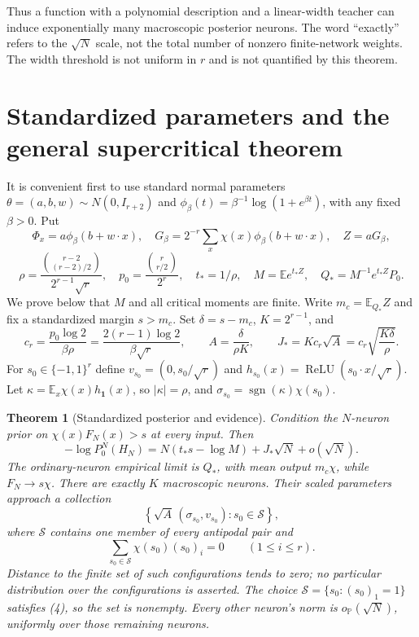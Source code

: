\documentclass[11pt]{article}
\newtheorem{theorem}{Theorem}\newtheorem{lemma}[theorem]{Lemma}
\newcommand{\E}{\mathbb E}\newcommand{\R}{\mathbb R}\newcommand{\Pp}{\mathbb P}
\newcommand{\one}{\mathbf1}\newcommand{\relu}{\operatorname{ReLU}}
\begin{document}
Thus a function with a polynomial description and a linear-width teacher
can induce exponentially many macroscopic posterior neurons. The word
``exactly'' refers to the $\sqrt N$ scale, not the total number of
nonzero finite-network weights. The width threshold is not uniform in
$r$ and is not quantified by this theorem.

\section{Standardized parameters and the general supercritical theorem}
It is convenient first to use standard normal parameters
$\theta=(a,b,w)\sim N(0,I_{r+2})$ and
$\phi_\beta(t)=\beta^{-1}\log(1+e^{\beta t})$, with any fixed $\beta>0$.
Put
\[
 \Phi_x=a\phi_\beta(b+w\cdot x),\quad
 G_\beta=2^{-r}\sum_x\chi(x)\phi_\beta(b+w\cdot x),\quad Z=aG_\beta,
\]
\[
 \rho=\frac{\binom{r-2}{(r-2)/2}}{2^{r-1}\sqrt r},\quad
 p_0=\frac{\binom r{r/2}}{2^r},\quad t_*=1/\rho,
 \quad M=\E e^{t_*Z},\quad Q_*=M^{-1}e^{t_*Z}P_0.
\]
We prove below that $M$ and all critical moments are finite.
Write $m_c=\E_{Q_*}Z$ and fix a standardized margin $s>m_c$.
Set $\delta=s-m_c$, $K=2^{r-1}$, and
\[
 c_r=\frac{p_0\log2}{\beta\rho}
       =\frac{2(r-1)\log2}{\beta\sqrt r},\qquad
 A=\frac{\delta}{\rho K},\qquad
 J_*=Kc_r\sqrt A=c_r\sqrt{\frac{K\delta}{\rho}}.             \tag{1}
\]
For $s_0\in\{-1,1\}^r$ define
$v_{s_0}=(0,s_0/\sqrt r)$ and
$h_{s_0}(x)=\relu(s_0\cdot x/\sqrt r)$.
Let $\kappa=\E_x\chi(x)h_{\one}(x)$, so $|\kappa|=\rho$, and
$\sigma_{s_0}=\operatorname{sgn}(\kappa)\chi(s_0)$.

\begin{theorem}[Standardized posterior and evidence]\label{thm:standard}
Condition the $N$-neuron prior on $\chi(x)F_N(x)>s$ at every input.
Then
\[
 -\log P_0^N(H_N)
  =N(t_*s-\log M)+J_*\sqrt N+o(\sqrt N).                    \tag{2}
\]
The ordinary-neuron empirical limit is $Q_*$, with mean output
$m_c\chi$, while $F_N\to s\chi$.
There are exactly $K$ macroscopic neurons. Their scaled parameters
approach a collection
\[
 \left\{\sqrt A\,(\sigma_{s_0},v_{s_0}):s_0\in\mathcal S\right\},
                                                               \tag{3}
\]
where $\mathcal S$ contains one member of every antipodal pair and
\[
 \sum_{s_0\in\mathcal S}\chi(s_0)(s_0)_i=0
                   \qquad(1\le i\le r).                    \tag{4}
\]
Distance to the finite set of such configurations tends to zero; no
particular distribution over the configurations is asserted.
The choice $\mathcal S=\{s_0:(s_0)_1=1\}$ satisfies (4), so the
set is nonempty. Every other neuron's norm is $o_{\Pp}(\sqrt N)$,
uniformly over those remaining neurons.
\end{theorem}
\end{document}
